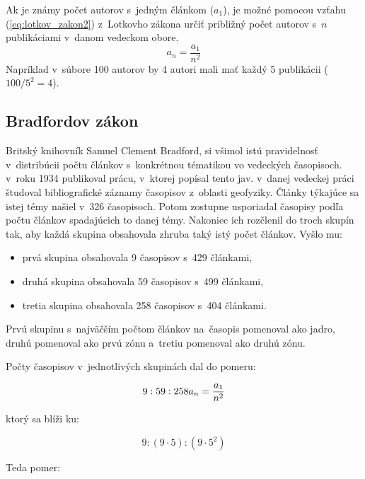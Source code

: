 Ak je známy počet autorov s~jedným článkom ($a_1$), je možné pomocou vzťahu
(\ref{eq:lotkov_zakon2}) z~Lotkovho zákona určiť približný počet autorov s~$n$
publikáciami v~danom vedeckom obore.
\begin{equation}
\label{eq:lotkov_zakon2}
a_n = \frac{a_1}{n^2}
\end{equation}
Napríklad v~súbore 100 autorov by 4 autori mali mať každý 5 publikácii
($100/5^2 = 4$).


\subsection{Bradfordov zákon}

Britský knihovník Samuel Clement Bradford, si všimol istú pravidelnosť
v~distribúcii počtu článkov s~konkrétnou tématikou vo vedeckých
časopisoch. v~roku 1934 publikoval prácu, v~ktorej popísal tento jav. v~danej
vedeckej práci študoval bibliografické záznamy časopisov z~oblasti
geofyziky. Články týkajúce sa istej témy našiel v~326 časopisoch. Potom zostupne
usporiadal časopisy podľa počtu článkov spadajúcich to danej témy. Nakoniec ich
rozčlenil do troch skupín tak, aby každá skupina obsahovala zhruba taký istý
počet článkov. Vyšlo mu:

\begin{itemize}
\item prvá skupina obsahovala 9 časopisov s~429 článkami,
\item druhá skupina obsahovala 59 časopisov s~499 článkami,
\item tretia skupina obsahovala 258 časopisov s~404 článkami.
\end{itemize}

Prvú skupinu  s~najväčším počtom článkov na~časopis pomenoval ako jadro, druhú
pomenoval ako prvú zónu a~tretiu pomenoval ako druhú zónu.

Počty časopisov v~jednotlivých skupinách dal do pomeru:

\begin{equation}
\label{eq:bradfordov_zakon1}
9 : 59 : 258 \\
a_n = \frac{a_1}{n^2}
\end{equation}

ktorý sa blíži ku:

\begin{equation}
\label{eq:bradfordov_zakon2}
9 : (9 \cdot 5) : (9 \cdot 5^2)
\end{equation}

Teda pomer:

